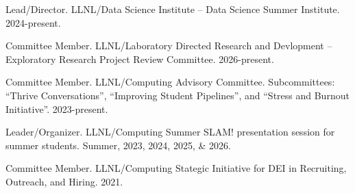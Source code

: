 \begin{innerlist}
  \item[-] Lead/Director.
  LLNL/Data Science Institute -- Data Science Summer Institute.
  2024-present.

  \item[-] Committee Member.
  LLNL/Laboratory Directed Research and Devlopment -- Exploratory Research Project Review Committee.
  2026-present.

  \item[-] Committee Member.
  LLNL/Computing Advisory Committee.
  Subcommittees: ``Thrive Conversations'', ``Improving Student Pipelines'', and ``Stress and Burnout Initiative''.  
  2023-present.

  \item[-] Leader/Organizer.
  LLNL/Computing Summer SLAM! presentation session for summer students.
  Summer, 2023, 2024, 2025, \& 2026.

  \item[-] Committee Member.
  LLNL/Computing Stategic Initiative for DEI in Recruiting, Outreach, and Hiring.
  2021.

\end{innerlist}

